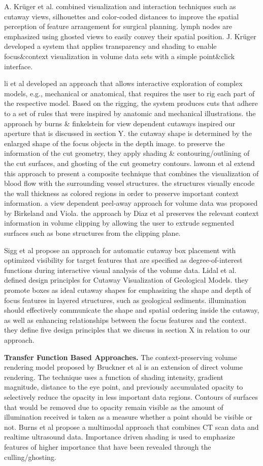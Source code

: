 A. Krüger et al. combined visualization and interaction techniques such as cutaway views, silhouettes and color-coded distances  to improve the spatial perception of feature arrangement for surgical planning.  lymph nodes are emphasized using ghosted views to easily convey their spatial position.
J. Krüger developed a system that applies transparency and shading to enable focus\&context visualization in volume data sets with a simple point\&click interface.

li et al developed an approach that allows interactive exploration of complex models, e.g., mechanical or anatomical, that requires  the user to rig each part of the respective model. Based on the rigging, the system produces cuts that adhere to a set of rules that were inspired by anatomic and mechanical illustrations. 
the approach by burns \& finkelstein for view dependent cutaways inspired our aperture that is discussed in section Y. the cutaway shape is determined by the enlarged shape of the focus objects in the depth image. to preserve the information of the cut geometry, they apply shading \& contouring/outlining of the cut surfaces, and ghosting of the cut geometry contours.  lawonn et al extend this approach to present a composite technique that combines the visualization of blood flow with the surrounding vessel structures. the structures visually encode the wall thickness as colored regions in order to preserve important context information. a view dependent peel-away approach for volume data was proposed by Birkeland and Viola. the approach by Diaz et al preserves the relevant context information in volume clipping by allowing the user to extrude segmented surfaces such as bone structures from the clipping plane.

Sigg et al propose an approach for automatic cutaway box placement with optimized visibility for target features that are specified as degree-of-interest functions during interactive visual analysis of the volume data. Lidal et al. defined design principles for Cutaway Visualization of Geological Models. they promote boxes as ideal cutaway shapes for emphasizing the shape and depth of focus features in layered structures, such as geological sediments. illumination should effectively communicate the shape and spatial ordering inside the cutaway, as well as enhancing relationships between the focus features and the context. they define five design principles that we discuss in section X in relation to our approach. 

\noindent
\textbf{Transfer Function Based Approaches.}
The context-preserving volume rendering model proposed by Bruckner et al is an extension of direct volume rendering. The technique uses a function of shading intensity, gradient magnitude, distance to the eye point, and previously accumulated opacity to selectively reduce the opacity in less important data regions. Contours of surfaces that would be removed due to opacity remain visible as the amount of illumination received is taken as a measure whether a point should be visible or not.
Burns et al propose a multimodal approach that combines CT scan data and realtime ultrasound data. Importance driven shading is used to emphasize features of higher importance that have been revealed through the culling/ghosting.

